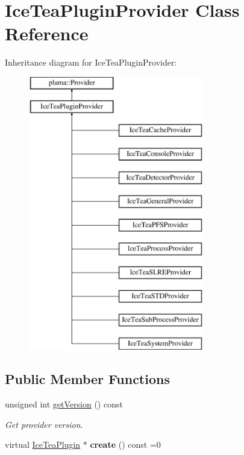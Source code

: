 \hypertarget{class_ice_tea_plugin_provider}{}\section{Ice\+Tea\+Plugin\+Provider Class Reference}
\label{class_ice_tea_plugin_provider}
Inheritance diagram for Ice\+Tea\+Plugin\+Provider\+:\begin{figure}[H]
\begin{center}
\leavevmode
\includegraphics[height=12.000000cm]{class_ice_tea_plugin_provider}
\end{center}
\end{figure}
\subsection*{Public Member Functions}
\begin{DoxyCompactItemize}
\item 
unsigned int \hyperlink{class_ice_tea_plugin_provider_a66d621770107000c1aede49d0d5335fc}{get\+Version} () const 
\begin{DoxyCompactList}\small\item\em Get provider version. \end{DoxyCompactList}\item 
virtual \hyperlink{class_ice_tea_plugin}{Ice\+Tea\+Plugin} $\ast$ {\bfseries create} () const  =0\hypertarget{class_ice_tea_plugin_provider_ae6814e21b89336e41b8c889c88a445d2}{}\label{class_ice_tea_plugin_provider_ae6814e21b89336e41b8c889c88a445d2}

\end{DoxyCompactItemize}
